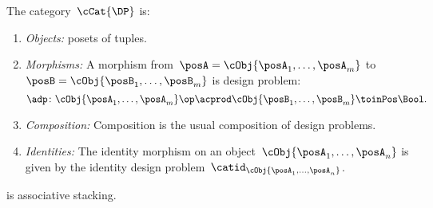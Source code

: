 \begin{definition}
    The category~$\cCat{\DP}$ is:
    \begin{enumerate}
        \item \emph{Objects:}
              posets of tuples.
        \item \emph{Morphisms:}
              A morphism from~$\posA =\cObj{\posA_1,\ldots, \posA_m}$ to~$\posB = \cObj{\posB_1,\ldots, \posB_m}$ is design problem:
              \begin{equation*}
                  \adp\colon \cObj{\posA_1,\ldots, \posA_m}\op \acprod \cObj{\posB_1,\ldots, \posB_m} \toinPos \Bool.
              \end{equation*}
        \item \emph{Composition:}
              Composition is the usual composition of design problems.
        \item \emph{Identities:}
              The identity morphism on an object~$\cObj{\posA_1,\ldots,\posA_n}$ is given by the identity design problem~$\catid_{\cObj{\posA_1,\ldots, \posA_n}}$.
    \end{enumerate}
\end{definition}

\begin{lemma}
    \cCat{\DP} is associative stacking.
\end{lemma}

